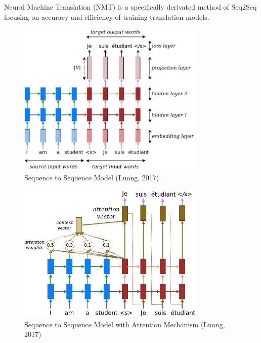 \documentclass[10pt,a4paper]{report}
\begin{document}
Neural Machine Translation (NMT) is a specifically derivated method of Seq2Seq focusing on accuracy and efficiency of training translation models.

\clearpage

\begin{figure}
\begin{center}
\includegraphics[width=0.8\textwidth]{seq2seq.jpg}
\caption{Sequence to Sequence Model (Luong, 2017)}
\end{center}
\end{figure}

\begin{figure}
\begin{center}
\includegraphics[width=0.8\textwidth] {attention_mechanism.jpg}
\caption{Sequence to Sequence Model with Attention Mechanism (Luong, 2017)}
\end{center}
\end{figure}

\clearpage
\end{document}
